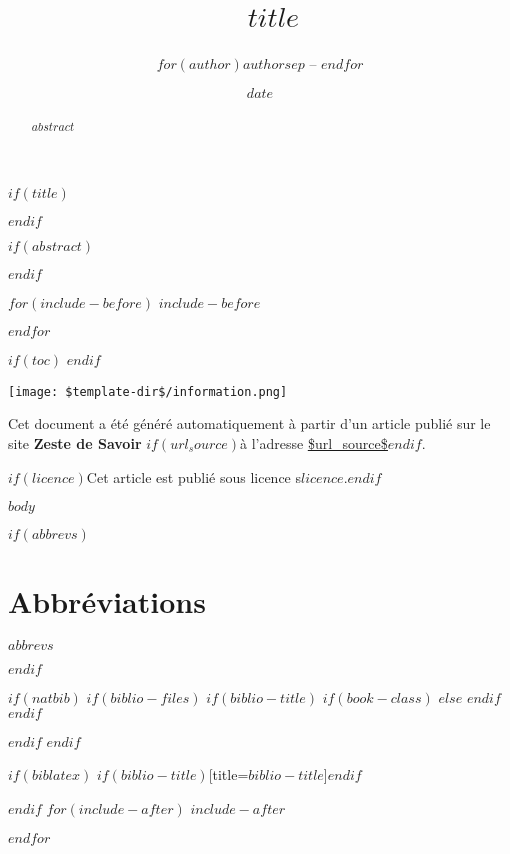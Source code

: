 \documentclass[$if(fontsize)$$fontsize$,$endif$$if(lang)$$lang$,$endif$$if(papersize)$$papersize$,$endif$$for(classoption)$$classoption$$sep$,$endfor$]{$documentclass$}
\title{\vcenteredinclude{$icon_path$}\ \color{titlecolor} $title$}
\subtitle{\color{subtitlecolor}$subtitle$\\\textcolor{sectionfontcolor}{\rule{0.8\textwidth}{2pt}}}
\author{$for(author)$$author$$sep$ -- $endfor$}
\date{\color{subtitlecolor}$date$}
\let\urlOld\url
\renewcommand{\url}[1]{\textcolor{linkColor}{\underline{\urlOld{#1}}}}
\newcommand\infoImage{\texttt{[image: \$template-dir\$/information.png]}}
\newenvironment{information}{\noindent\begin{tcolorbox}[colback=infoColor,boxrule=0pt,arc=0pt,colframe=infoColor!50!black]\begin{minipage}{.1\textwidth}\infoImage\end{minipage}\begin{minipage}{.85\textwidth}}{\end{minipage}\hfill\end{tcolorbox}}
\begin{document}
$if(title)$
  \maketitle
$endif$

$if(abstract)$
\begin{abstract}
$abstract$
\end{abstract}
$endif$

$for(include-before)$
$include-before$

$endfor$


$if(toc)$
{
\hypersetup{linkcolor=ocre}
\setcounter{tocdepth}{$toc-depth$}
\tableofcontents
}
$endif$

\begin{information}
Cet document a été généré automatiquement à partir d'un article publié sur le site \textbf{Zeste de Savoir} $if(url_source)$à l'adresse \url{$url_source$}$endif$.


$if(licence)$Cet article est publié sous licence s\textbf{$licence$}.$endif$
\end{information}



$body$

$if(abbrevs)$
\section*{Abbréviations}

$abbrevs$

$endif$

\printendnotes

$if(natbib)$
$if(biblio-files)$
$if(biblio-title)$
$if(book-class)$
\renewcommand\bibname{$biblio-title$}
$else$
\renewcommand\refname{$biblio-title$}
$endif$
$endif$


$endif$
$endif$

$if(biblatex)$
\printbibliography$if(biblio-title)$[title=$biblio-title$]$endif$

$endif$
$for(include-after)$
$include-after$

$endfor$
\end{document}
